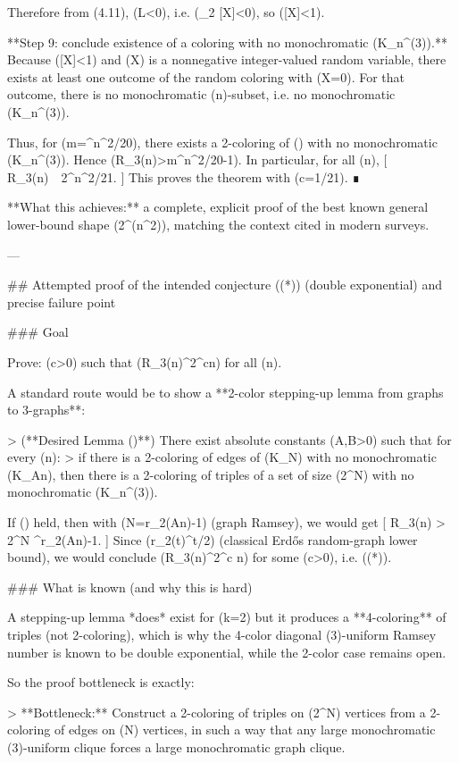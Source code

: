 Therefore from (4.11), (L<0), i.e. (\log_2 [X]<0), so ([X]<1).

**Step 9: conclude existence of a coloring with no monochromatic (K_n^{(3)}).**
Because ([X]<1) and (X) is a nonnegative integer-valued random variable, there exists at least one outcome of the random coloring with (X=0). For that outcome, there is no monochromatic (n)-subset, i.e. no monochromatic (K_n^{(3)}).

Thus, for (m=^{n^2/20}\rfloor), there exists a 2-coloring of () with no monochromatic (K_n^{(3)}). Hence (R_3(n)>m^{n^2/20-1}). In particular, for all (n),
[
R_3(n)\ \ge\ 2^{n^2/21}.
]
This proves the theorem with (c=1/21). ∎

**What this achieves:** a complete, explicit proof of the best known general lower-bound shape (2^{\Omega(n^2)}), matching the context cited in modern surveys. 

---

## Attempted proof of the intended conjecture ((*)) (double exponential) and precise failure point

### Goal

Prove: (\exists c>0) such that (R_3(n)^{2^{cn}}) for all (n).

A standard route would be to show a **2-color stepping-up lemma from graphs to 3-graphs**:

> (**Desired Lemma ()**) There exist absolute constants (A,B>0) such that for every (n):
> if there is a 2-coloring of edges of (K_N) with no monochromatic (K_{An}), then there is a 2-coloring of triples of a set of size (2^N) with no monochromatic (K_n^{(3)}).

If () held, then with (N=r_2(An)-1) (graph Ramsey), we would get
[
R_3(n) > 2^N ^{r_2(An)-1}.
]
Since (r_2(t)^{t/2}) (classical Erdős random-graph lower bound), we would conclude (R_3(n)^{2^{c n}}) for some (c>0), i.e. ((*)).

### What is known (and why this is hard)

A stepping-up lemma *does* exist for (k=2) but it produces a **4-coloring** of triples (not 2-coloring), which is why the 4-color diagonal (3)-uniform Ramsey number is known to be double exponential, while the 2-color case remains open. 

So the proof bottleneck is exactly:

> **Bottleneck:** Construct a 2-coloring of triples on (2^N) vertices from a 2-coloring of edges on (N) vertices, in such a way that any large monochromatic (3)-uniform clique forces a large monochromatic graph clique.

